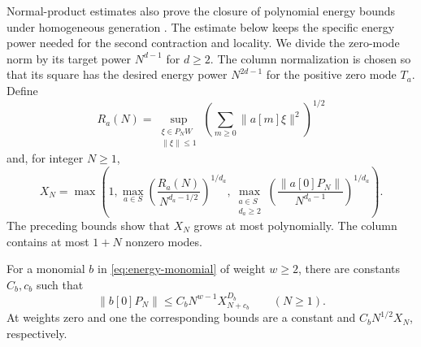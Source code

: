 Normal-product estimates also prove the closure of polynomial energy
bounds under homogeneous generation \cite[Proposition~6.1]{CKLW}.
The estimate below keeps the specific energy power needed for the
second contraction and locality. We divide the zero-mode norm by its
target power $N^{d-1}$ for $d\geq2$. The column normalization is
chosen so that its square has the desired energy power $N^{2d-1}$
for the positive zero mode $T_a$. Define
\[
 R_a(N)=\sup_{\substack{\xi\in P_NW\\\|\xi\|\leq1}}
          \left(\sum_{m\geq0}\|a[m]\xi\|^2\right)^{1/2}
\]
and, for integer $N\geq1$,
\begin{equation}\label{eq:sharp-energy-control}
 X_N=\max\left(
 1,
 \max_{a\in S}\left(\frac{R_a(N)}{N^{d_a-1/2}}\right)^{1/d_a},
 \max_{\substack{a\in S\\d_a\geq2}}
       \left(\frac{\|a[0]P_N\|}{N^{d_a-1}}\right)^{1/d_a}
 \right).
\end{equation}
The preceding bounds show that $X_N$ grows at most polynomially.
The column contains at most $1+N$ nonzero modes.

\begin{lemma}\label{lem:sharp-normal-product}
For a monomial $b$ in \eqref{eq:energy-monomial} of weight $w\geq2$,
there are constants $C_b,c_b$ such that
\begin{equation}\label{eq:sharp-normal-product}
 \|b[0]P_N\|
 \leq C_b N^{w-1}X_{N+c_b}^{D_b}\qquad(N\geq1).
\end{equation}
At weights zero and one the corresponding bounds are a constant and
$C_bN^{1/2}X_N$, respectively.
\end{lemma}

